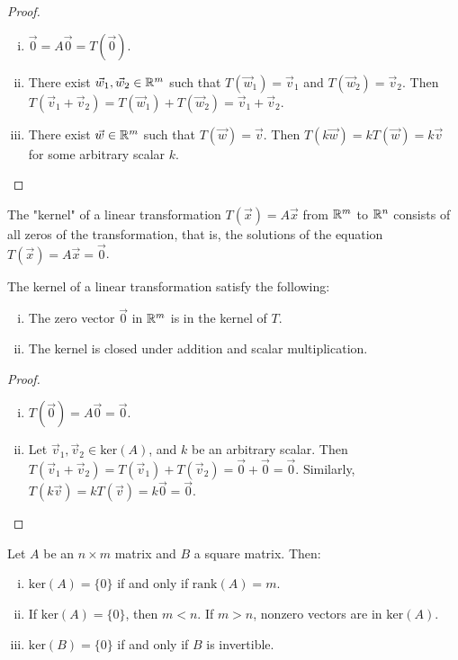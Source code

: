 \documentclass[a4paper,11pt]{article}
\begin{document}
\begin{outline}
    \begin{proof}
      \begin{enumerate}[i.]
        \item
          \(\vec{0} = A\vec{0} = T(\vec{0})\).
        \item
          There exist \(\vec{w}_1, \vec{w}_2 \in \mathbb{R}^m\) such that \(T(\vec{w}_1) = \vec{v}_1\) and
          \(T(\vec{w}_2) = \vec{v}_2\). Then \(T(\vec{v}_1 + \vec{v}_2) = T(\vec{w}_1) + T(\vec{w}_2) =
          \vec{v}_1 + \vec{v}_2\).
        \item
          There exist \(\vec{w} \in \mathbb{R}^m\) such that \(T(\vec{w}) = \vec{v}\). Then \(T(k\vec{w}) =
          kT(\vec{w}) = k\vec{v}\) for some arbitrary scalar \(k\).
      \end{enumerate}
    \end{proof}

    The "kernel" of a linear transformation \(T(\vec{x}) = A\vec{x}\) from \(\mathbb{R}^m\) to \(\mathbb{R}^n\)
    consists of all zeros of the transformation, that is, the solutions of the equation \(T(\vec{x}) = A\vec{x}
    = \vec{0}\).
    
    The kernel of a linear transformation satisfy the following:
    \begin{enumerate}[i.]
      \item
        The zero vector \(\vec{0}\) in \(\mathbb{R}^m\) is in the kernel of \(T\).
      \item
        The kernel is closed under addition and scalar multiplication.
    \end{enumerate}

    \begin{proof}
      \begin{enumerate}[i.]
        \item
          \(T(\vec{0}) = A\vec{0} = \vec{0}\).
        \item
          Let \(\vec{v}_1, \vec{v}_2 \in \text{ker}(A)\), and \(k\) be an arbitrary scalar. Then \(T(\vec{v}_1
          + \vec{v}_2) = T(\vec{v}_1) + T(\vec{v}_2) = \vec{0} + \vec{0} = \vec{0}\). Similarly, \(T(k\vec{v}) 
          = kT(\vec{v}) = k\vec{0} = \vec{0}\).
      \end{enumerate}
    \end{proof}
    
    Let \(A\) be an \(n \times m\) matrix and \(B\) a square matrix. Then:
    \begin{enumerate}[i.]
      \item \(\text{ker}(A) = \{0\}\) if and only if \(\text{rank}(A) = m\).
      \item If \(\text{ker}(A) = \{0\}\), then \(m < n\). If \(m > n\), nonzero vectors are in \(\text{ker}(A)\).
      \item \(\text{ker}(B) = \{0\}\) if and only if \(B\) is invertible.
    \end{enumerate}
    

\end{outline}
\end{document}
